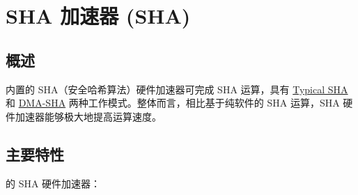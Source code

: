 \documentclass[main\_\_CN.tex]{subfiles}
\begin{document}
\setchineseformatting

\ifglobal
\else
    \clearpage
    \listoftodos
    \listofdonetodos
    \tableofcontents
\fi



\hypertarget{sha}{}
\chapter{SHA 加速器 (SHA)} \label{mod:sha}

\section{概述}

\chipname{} 内置的 SHA（安全哈希算法）硬件加速器可完成 SHA 运算，具有 \hyperref[sec:sha-typical-sha]{Typical SHA} 和 \hyperref[sec:sha-dma-sha]{DMA-SHA} 两种工作模式。整体而言，相比基于纯软件的 SHA 运算，SHA 硬件加速器能够极大地提高运算速度。

\section{主要特性}

\chipname{} 的 SHA 硬件加速器：
\end{document}
